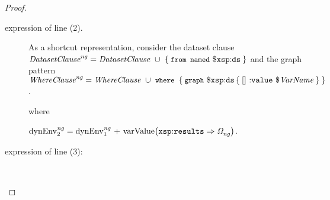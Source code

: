 \begin{proof}
\begin{description}
\item[\LET expression of line (2).] As a shortcut representation, consider the dataset clause~${\mathit{{\textit{Da\-ta\-set\-Clau\-se}}}}_{\mathit{}}^{\mathit{ng}}
  = {\textit{Da\-ta\-set\-Clau\-se}}\ \cup\ \left\{\: \texttt{{\small from~named}}\ \$\mathtt{xsp{:}ds} \:\right\}$ and the graph pattern~${\mathit{{\textit{Whe\-re\-Clause}}}}_{\mathit{}}^{\mathit{ng}} =
  {\textit{Whe\-re\-Clause}}\ \cup\ \texttt{{\small where}}\ \left\{\: \texttt{{\small graph}}\ \$\mathtt{xsp{:}ds} \left\{\: \mathtt{[]\ {:}value}\  \$\mathit{VarName} \:\right\} \:\right\}$.

    \begin{prooftreefunction}
      
      
    \end{prooftreefunction}%
  where 
  \begin{small}
    $\mathrm{dynEnv}_{2}^{\mathit{ng}} = \mathrm{dynEnv}_{1}^{\mathit{ng}}\textrm{ + }\textrm{varValue}\!\left( \mathtt{xsp{:}results} \Rightarrow {\mathit{\Omega}}_{\mathit{ng}}^{\mathit{}} \right)$.
  \end{small}%

  \item[\FOR expression of line (3):]~

    \begin{prooftreefunction}



\end{prooftreefunction}
\end{description}
\end{proof}
